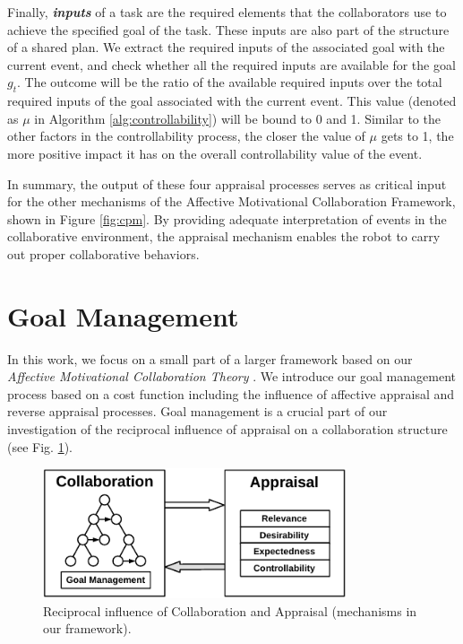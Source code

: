 Finally, \textit{\textbf{inputs}} of a task are the required elements that the
collaborators use to achieve the specified goal of the task. These inputs are
also part of the structure of a shared plan. We extract the required inputs of
the associated goal with the current event, and check whether all the required
inputs are available for the goal $\mathit{g}_{t}$. The outcome will be the
ratio of the available required inputs over the total required inputs of the
goal associated with the current event. This value (denoted as $\mu$ in
Algorithm \ref{alg:controllability}) will be bound to 0 and 1. Similar to the
other factors in the controllability process, the closer the value of $\mu$ gets
to 1, the more positive impact it has on the overall controllability value of
the event.

In summary, the output of these four appraisal processes serves as critical
input for the other mechanisms of the Affective Motivational Collaboration
Framework, shown in Figure \ref{fig:cpm}. By providing adequate interpretation
of events in the collaborative environment, the appraisal mechanism enables the
robot to carry out proper collaborative behaviors.

\section{Goal Management}
\label{sec:goal-management}

In this work, we focus on a small part of a larger framework based on our
\textit{Affective Motivational Collaboration Theory}
\cite{shayganfar:amct-symbiotic}. We introduce our goal management process based
on a cost function including the influence of affective appraisal and reverse
appraisal processes. Goal management is a crucial part of our investigation of
the reciprocal influence of appraisal on a collaboration structure (see Fig.
\ref{fig:actionSelection}).

\begin{figure}[tbh]
  \centering
  \includegraphics[width=0.8\textwidth]{figure/ActionSelection-croped.pdf}
  \caption{{\fontsize{9}{9}\selectfont Reciprocal influence of Collaboration
  and Appraisal (mechanisms in our framework).}}
  \label{fig:actionSelection}
  \vspace*{-2mm}
\end{figure}


